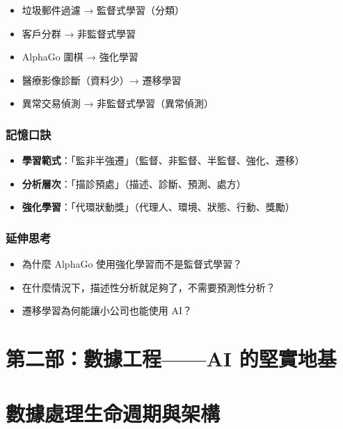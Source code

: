 \documentclass[
  letterpaper,
  DIV=11,
  numbers=noendperiod]{scrreprt}
\providecommand{\tightlist}{%
  \setlength{\itemsep}{0pt}\setlength{\parskip}{0pt}}
\begin{document}
\begin{enumerate}
  \begin{itemize}
  \tightlist
  \item
    垃圾郵件過濾 → 監督式學習（分類）
  \item
    客戶分群 → 非監督式學習
  \item
    AlphaGo 圍棋 → 強化學習
  \item
    醫療影像診斷（資料少）→ 遷移學習
  \item
    異常交易偵測 → 非監督式學習（異常偵測）
  \end{itemize}
\end{enumerate}

\section{記憶口訣}\label{ux8a18ux61b6ux53e3ux8a23-1}

\begin{itemize}
\tightlist
\item
  \textbf{學習範式}：「監非半強遷」（監督、非監督、半監督、強化、遷移）
\item
  \textbf{分析層次}：「描診預處」（描述、診斷、預測、處方）
\item
  \textbf{強化學習}：「代環狀動獎」（代理人、環境、狀態、行動、獎勵）
\end{itemize}

\section{延伸思考}\label{ux5ef6ux4f38ux601dux8003-1}

\begin{itemize}
\tightlist
\item
  為什麼 AlphaGo 使用強化學習而不是監督式學習？
\item
  在什麼情況下，描述性分析就足夠了，不需要預測性分析？
\item
  遷移學習為何能讓小公司也能使用 AI？
\end{itemize}

\part{第二部：數據工程------AI 的堅實地基}

\part{數據處理生命週期與架構}\label{ux6578ux64daux8655ux7406ux751fux547dux9031ux671fux8207ux67b6ux69cb}
\end{document}
